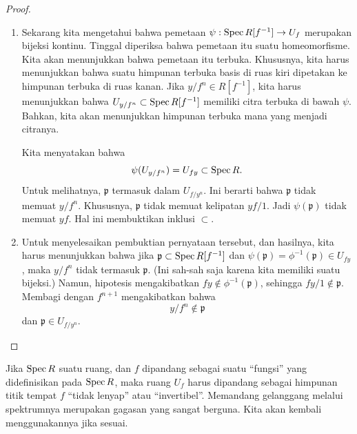 \begin{proof}
\begin{enumerate}
Andaikan $\frac{x}{f^n} \in \mathfrak{p}$. Maka $x/1 \in
\mathfrak{p}$, sehingga $x
\in \phi^{-1}(\mathfrak{p}) = \phi^{-1}(\mathfrak{p}')$. Ini
berarti bahwa $x/1
\in \mathfrak{p}'$, sehingga 
$\frac{x}{f^n} \in \mathfrak{p}'$ juga. Jadi setiap pecahan yang
termasuk
$\mathfrak{p}$ juga termasuk $\mathfrak{p}'$. Berdasarkan simetri, kedua ideal itu
harus
sama.  
\item Sekarang kita mengetahui bahwa pemetaan $\psi: \operatorname{Spec} R[f^{-1}] \to U_f$
merupakan bijeksi
kontinu. Tinggal diperiksa bahwa pemetaan itu suatu homeomorfisme. Kita akan
menunjukkan bahwa pemetaan itu
terbuka.  
Khususnya, kita harus menunjukkan bahwa suatu himpunan terbuka basis di ruas kiri
dipetakan
ke himpunan terbuka di ruas kanan.
Jika $y/f^n \in R[f^{-1}]$, kita harus menunjukkan bahwa $U_{y/f^n}
\subset \operatorname{Spec}
R[f^{-1}]$ memiliki citra terbuka di bawah $\psi$. Bahkan, kita akan menunjukkan himpunan
terbuka mana yang menjadi citranya.

Kita menyatakan bahwa
\[ \psi(U_{y/f^n}) = U_{fy} \subset \operatorname{Spec} R.  \]
Untuk melihatnya, $\mathfrak{p}$ termasuk dalam $U_{f/y^n}$. Ini
berarti bahwa
$\mathfrak{p}$ tidak memuat $y/f^n$. Khususnya,
$\mathfrak{p}$ tidak
memuat kelipatan $yf/1$. Jadi $\psi(\mathfrak{p})$ tidak
memuat $yf$.
Hal ini membuktikan inklusi $\subset$.  

\item 
Untuk menyelesaikan pembuktian pernyataan tersebut, dan
hasilnya, kita harus menunjukkan bahwa jika $\mathfrak{p} \subset \operatorname{Spec}
R[f^{-1}]$ dan
$\psi(\mathfrak{p}) = \phi^{-1}(\mathfrak{p}) \in U_{fy}$, maka
$y/f^n$ tidak
termasuk $\mathfrak{p}$. (Ini sah-sah saja karena
kita memiliki suatu bijeksi.) Namun, hipotesis mengakibatkan $fy \notin
\phi^{-1}(\mathfrak{p})$, sehingga $fy/1 \notin \mathfrak{p}$.
Membagi dengan $f^{n+1}$
mengakibatkan bahwa
\[ y/f^{n} \notin \mathfrak{p}  \]
dan $\mathfrak{p} \in U_{f/y^n}$. 
\end{enumerate}
\end{proof}

Jika $\operatorname{Spec} R$ suatu ruang, dan $f$ dipandang sebagai suatu ``fungsi'' yang
didefinisikan pada
$\operatorname{Spec} R$, maka ruang $U_f$ harus dipandang sebagai himpunan
titik tempat $f$
``tidak lenyap'' atau ``invertibel''.
Memandang gelanggang melalui spektrumnya merupakan gagasan yang sangat berguna.
Kita akan kembali menggunakannya jika sesuai.  

